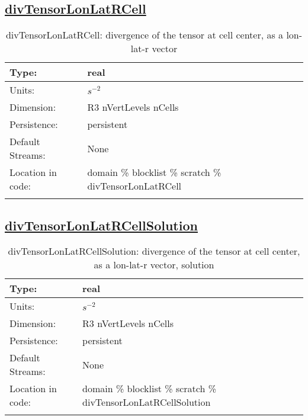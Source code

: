 \subsection[divTensorLonLatRCell]{\hyperref[sec:var_tab_scratch]{divTensorLonLatRCell}}
\label{subsec:var_sec_scratch_divTensorLonLatRCell}
\begin{center}
\begin{longtable}{| p{2.0in} | p{4.0in} |}
        \hline 
        Type: & real \\
        \hline 
        Units: & $s^{-2}$ \\
        \hline 
        Dimension: & R3 nVertLevels nCells \\
        \hline 
        Persistence: & persistent \\
        \hline 
		 Default Streams: & None \\
        \hline 
		 Location in code: & domain \% blocklist \% scratch \% divTensorLonLatRCell \\
		 \hline 
    \caption{divTensorLonLatRCell: divergence of the tensor at cell center, as a lon-lat-r vector}
\end{longtable}
\end{center}
\subsection[divTensorLonLatRCellSolution]{\hyperref[sec:var_tab_scratch]{divTensorLonLatRCellSolution}}
\label{subsec:var_sec_scratch_divTensorLonLatRCellSolution}
\begin{center}
\begin{longtable}{| p{2.0in} | p{4.0in} |}
        \hline 
        Type: & real \\
        \hline 
        Units: & $s^{-2}$ \\
        \hline 
        Dimension: & R3 nVertLevels nCells \\
        \hline 
        Persistence: & persistent \\
        \hline 
		 Default Streams: & None \\
        \hline 
		 Location in code: & domain \% blocklist \% scratch \% divTensorLonLatRCellSolution \\
		 \hline 
    \caption{divTensorLonLatRCellSolution: divergence of the tensor at cell center, as a lon-lat-r vector, solution}
\end{longtable}
\end{center}
